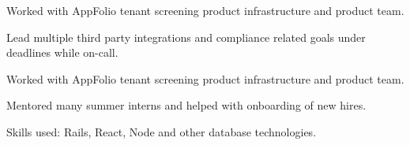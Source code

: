     \begin{tightemize}
      \item Worked with AppFolio tenant screening product infrastructure and product team.
      \item Lead multiple third party integrations and compliance related goals under deadlines while on-call.
    \end{tightemize} 
    \sectionsep

    \begin{tightemize}
      \item Worked with AppFolio tenant screening product infrastructure and product team.
      \item Mentored many summer interns and helped with onboarding of new hires.
      \item Skills used: Rails, React, Node and other database technologies.
    \end{tightemize}
    \sectionsep


